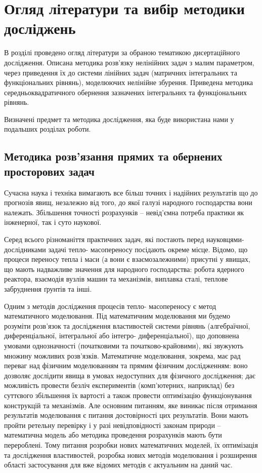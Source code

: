 \chapter{Огляд літератури та вибір методики досліджень} \label{chapt1}

В розділі проведено огляд літератури за обраною тематикою дисертаційного дослідження. Описана методика розв’язку
нелінійних задач з малим параметром, через приведення їх до системи лінійних задач (матричних інтегральних та
функціональних рівнянь), моделюючих нелінійне збурення. Приведена методика середньоквадратичного обернення зазначених
інтегральних та функціональних рівнянь.

Визначені предмет та методика дослідження, яка буде використана нами у подальших розділах роботи.

\section{Методика розв’язання  прямих та обернених просторових задач} \label{sect1_1}

Сучасна наука і техніка вимагають  все більш точних і надійних результатів що до прогнозів явищ, незалежно від того,
до якої галузі народного господарства вони належать. Збільшення точності розрахунків – невід’ємна потреба практики
як інженерної, так і суто наукової.

Серед всього різноманіття практичних задач, які постають перед науковцями-дослідниками задачі тепло- масопереносу
посідають окреме місце. Відомо, що процеси переносу тепла і маси (а вони є взаємозалежними) присутні у явищах, що
мають надважливе значення для народного господарства: робота ядерного реактора, взаємодія вузлів машин та механізмів,
виплавка сталі, теплове забруднення ґрунтів та інші.

Одним з методів дослідження процесів тепло- масопереносу є метод математичного моделювання. Під математичним
моделювання ми будемо розуміти розв’язок та дослідження властивостей системи рівнянь (алгебраїчної, диференціальної,
інтегральної або інтегро- диференціальної), що доповнена умовами однозначності (початковими та початково-крайовими),
які звужують множину можливих розв’язків. Математичне моделювання, зокрема, має рад переваг над фізичним моделюванням
та прямим фізичним дослідженням: воно дозволяє дослідити явища в умовах недоступних для фізичного дослідження;
дає можливість провести безліч експериментів (комп’ютерних, наприклад) без суттєвого збільшення їх вартості
а також провести оптимізацію функціонування конструкцій та механізмів. Але основним питанням, яке виникає після
отримання результатів моделювання є питання достовірності цих результатів. Вони мають пройти ретельну перевірку і у
разі невідповідності законам природи –  математична модель або методика проведення розрахунків мають бути перероблені.
Тому питання розробки нових математичних моделей, їх оптимізація та дослідження властивостей, розробка нових методів
моделювання і розширення області застосування для вже відомих методів є актуальним на даний час.

